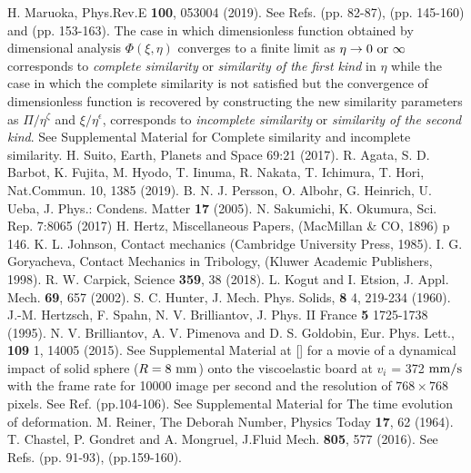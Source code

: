 \documentclass[default,iicol,10pt]{sn-jnl}%
\theoremstyle{thmstyleone}%
\theoremstyle{thmstyletwo}%
\theoremstyle{thmstylethree}%
\begin{document}
\begin{thebibliography}{99}
H. Maruoka, Phys.Rev.E {\bf 100}, 053004 (2019).
See Refs. \cite{Barenblatt2003} (pp. 82-87), \cite{Barenblatt1996} (pp. 145-160) and \cite{Barenblatt2014} (pp. 153-163). The case in which dimensionless function obtained by dimensional analysis $\Phi(\xi,\eta)$ converges to a finite limit as $\eta \rightarrow 0~{\rm or}~\infty$ corresponds to {\it complete similarity} or {\it similarity of the first kind} in $\eta$ while the case in which the complete similarity is not satisfied but the convergence of dimensionless function is recovered by constructing the new similarity parameters as $\Pi/\eta^{\zeta}$ and $\xi/\eta^{\epsilon}$, corresponds to {\it incomplete similarity} or {\it similarity of the second kind}. See Supplemental Material for Complete similarity and incomplete similarity.
H. Suito, Earth, Planets and Space 69:21 (2017).
R. Agata, S. D. Barbot, K. Fujita, M. Hyodo, T. Iinuma, R. Nakata, T. Ichimura, T. Hori, Nat.Commun. 10, 1385 (2019). 
B. N. J. Persson, O. Albohr, G. Heinrich, U. Ueba, J. Phys.: Condens. Matter {\bf 17} (2005).
N. Sakumichi, K. Okumura, Sci. Rep. 7:8065 (2017)
H. Hertz, Miscellaneous Papers, (MacMillan \& CO, 1896) p 146.
K. L. Johnson, Contact mechanics (Cambridge University Press, 1985).
I. G. Goryacheva, Contact Mechanics in Tribology, (Kluwer Academic Publishers, 1998).
R. W. Carpick, Science {\bf 359}, 38 (2018).
L. Kogut and I. Etsion, J. Appl. Mech. {\bf 69}, 657 (2002).
S. C. Hunter, J. Mech. Phys. Solids, {\bf 8} 4,  219-234 (1960).
J.-M. Hertzsch, F. Spahn, N. V. Brilliantov, J. Phys. II France {\bf 5} 1725-1738 (1995). 
N. V. Brilliantov, A. V. Pimenova and D. S. Goldobin, Eur. Phys. Lett., {\bf 109} 1, 14005 (2015).
See Supplemental Material at [] for a movie of a dynamical impact of solid sphere ($R = 8~{\rm mm}$) onto the viscoelastic board at $v_i$ = 372 ${\rm mm / s}$ with the frame rate for 10000 image per second and the resolution of $768 \times 768$ pixels. 
See Ref. \cite{Johnson} (pp.104-106).
See Supplemental Material for The time evolution of deformation. 
M. Reiner, The Deborah Number, Physics Today {\bf 17}, 62 (1964).
T. Chastel, P. Gondret and A. Mongruel, J.Fluid Mech. {\bf 805}, 577 (2016).
See Refs. \cite{Barenblatt2003} (pp. 91-93), \cite{Barenblatt1996} (pp.159-160).

\end{thebibliography}
\end{document}
